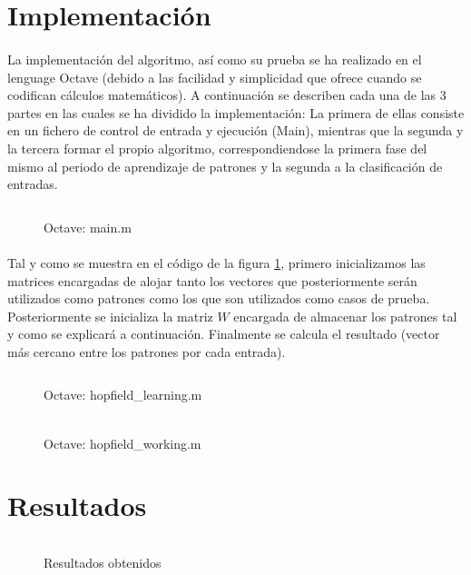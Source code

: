 \documentclass[10pt, a4paper,spanish]{article}
\begin{document}
	\section{Implementación}

		\paragraph{}
		La implementación del algoritmo, así como su prueba se ha realizado en el lenguage Octave (debido a las facilidad y simplicidad que ofrece cuando se codifican cálculos matemáticos). A continuación se describen cada una de las 3 partes en las cuales se ha dividido la implementación: La primera de ellas consiste en un fichero de control de entrada y ejecución (Main), mientras que la segunda y la tercera formar el propio algoritmo, correspondiendose la primera fase del mismo al periodo de aprendizaje de patrones y la segunda a la clasificación de entradas.

		\begin{figure}[H]
			\centering
			\inputminted{octave}{../src/main.m}
			\caption{Octave: main.m}
			\label{code:main}
		\end{figure}

		\paragraph{}
		Tal y como se muestra en el código de la figura \ref{code:main}, primero inicializamos las matrices encargadas de alojar tanto los vectores que posteriormente serán utilizados como patrones como los que son utilizados como casos de prueba. Posteriormente se inicializa la matriz $W$ encargada de almacenar los patrones tal y como se explicará a continuación. Finalmente se calcula el resultado (vector más cercano entre los patrones por cada entrada).

		\begin{figure}[H]
			\centering
			\inputminted{octave}{../src/hopfield_learning.m}
			\caption{Octave: hopfield\_learning.m}
			\label{code:learning}
		\end{figure}

		\paragraph{}

		\begin{figure}[H]
			\centering
			\inputminted{octave}{../src/hopfield_working.m}
			\caption{Octave: hopfield\_working.m}
			\label{code:working}
		\end{figure}

		\paragraph{}


	\section{Resultados}

		\paragraph{}
		\begin{figure}[H]
			\centering
			\inputminted{bash}{../output.txt}
			\caption{Resultados obtenidos}
			\label{results}

		\end{figure}
\end{document}
